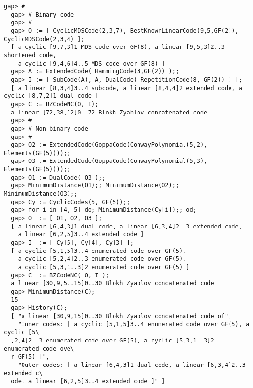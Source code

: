 \documentclass[a4paper,11pt]{report}
\begin{document}
{{ 
\begin{Verbatim}[fontsize=\small,frame=single,label=Example]
  gap> #
  gap> # Binary code
  gap> #
  gap> O := [ CyclicMDSCode(2,3,7), BestKnownLinearCode(9,5,GF(2)), CyclicMDSCode(2,3,4) ];
  [ a cyclic [9,7,3]1 MDS code over GF(8), a linear [9,5,3]2..3 shortened code, 
    a cyclic [9,4,6]4..5 MDS code over GF(8) ]
  gap> A := ExtendedCode( HammingCode(3,GF(2)) );;
  gap> I := [ SubCode(A), A, DualCode( RepetitionCode(8, GF(2)) ) ];
  [ a linear [8,3,4]3..4 subcode, a linear [8,4,4]2 extended code, a cyclic [8,7,2]1 dual code ]
  gap> C := BZCodeNC(O, I);
  a linear [72,38,12]0..72 Blokh Zyablov concatenated code
  gap> #
  gap> # Non binary code
  gap> #
  gap> O2 := ExtendedCode(GoppaCode(ConwayPolynomial(5,2), Elements(GF(5))));;
  gap> O3 := ExtendedCode(GoppaCode(ConwayPolynomial(5,3), Elements(GF(5))));;
  gap> O1 := DualCode( O3 );;
  gap> MinimumDistance(O1);; MinimumDistance(O2);; MinimumDistance(O3);;
  gap> Cy := CyclicCodes(5, GF(5));;
  gap> for i in [4, 5] do; MinimumDistance(Cy[i]);; od;
  gap> O  := [ O1, O2, O3 ];
  [ a linear [6,4,3]1 dual code, a linear [6,3,4]2..3 extended code,
    a linear [6,2,5]3..4 extended code ]
  gap> I  := [ Cy[5], Cy[4], Cy[3] ];
  [ a cyclic [5,1,5]3..4 enumerated code over GF(5),
    a cyclic [5,2,4]2..3 enumerated code over GF(5),
    a cyclic [5,3,1..3]2 enumerated code over GF(5) ]
  gap> C  := BZCodeNC( O, I );
  a linear [30,9,5..15]0..30 Blokh Zyablov concatenated code
  gap> MinimumDistance(C);
  15
  gap> History(C);
  [ "a linear [30,9,15]0..30 Blokh Zyablov concatenated code of",
    "Inner codes: [ a cyclic [5,1,5]3..4 enumerated code over GF(5), a cyclic [5\
  ,2,4]2..3 enumerated code over GF(5), a cyclic [5,3,1..3]2 enumerated code ove\
  r GF(5) ]",
    "Outer codes: [ a linear [6,4,3]1 dual code, a linear [6,3,4]2..3 extended c\
  ode, a linear [6,2,5]3..4 extended code ]" ]
\end{Verbatim}
  }

 }

 
\end{document}
